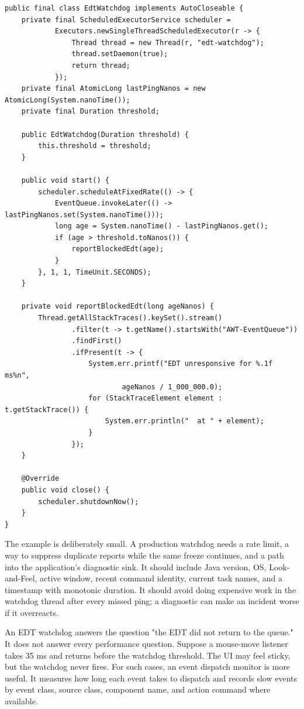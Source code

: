\begin{lstlisting}[caption={A small EDT watchdog that captures the blocked stack.}]
public final class EdtWatchdog implements AutoCloseable {
    private final ScheduledExecutorService scheduler =
            Executors.newSingleThreadScheduledExecutor(r -> {
                Thread thread = new Thread(r, "edt-watchdog");
                thread.setDaemon(true);
                return thread;
            });
    private final AtomicLong lastPingNanos = new AtomicLong(System.nanoTime());
    private final Duration threshold;

    public EdtWatchdog(Duration threshold) {
        this.threshold = threshold;
    }

    public void start() {
        scheduler.scheduleAtFixedRate(() -> {
            EventQueue.invokeLater(() -> lastPingNanos.set(System.nanoTime()));
            long age = System.nanoTime() - lastPingNanos.get();
            if (age > threshold.toNanos()) {
                reportBlockedEdt(age);
            }
        }, 1, 1, TimeUnit.SECONDS);
    }

    private void reportBlockedEdt(long ageNanos) {
        Thread.getAllStackTraces().keySet().stream()
                .filter(t -> t.getName().startsWith("AWT-EventQueue"))
                .findFirst()
                .ifPresent(t -> {
                    System.err.printf("EDT unresponsive for %.1f ms%n",
                            ageNanos / 1_000_000.0);
                    for (StackTraceElement element : t.getStackTrace()) {
                        System.err.println("  at " + element);
                    }
                });
    }

    @Override
    public void close() {
        scheduler.shutdownNow();
    }
}
\end{lstlisting}

The example is deliberately small. A production watchdog needs a rate limit, a way to suppress duplicate reports while the same freeze continues, and a path into the application's diagnostic sink. It should include Java version, OS, Look-and-Feel, active window, recent command identity, current task names, and a timestamp with monotonic duration. It should avoid doing expensive work in the watchdog thread after every missed ping; a diagnostic can make an incident worse if it overreacts.

An EDT watchdog answers the question "the EDT did not return to the queue." It does not answer every performance question. Suppose a mouse-move listener takes 35 ms and returns before the watchdog threshold. The UI may feel sticky, but the watchdog never fires. For such cases, an event dispatch monitor is more useful. It measures how long each event takes to dispatch and records slow events by event class, source class, component name, and action command where available.

